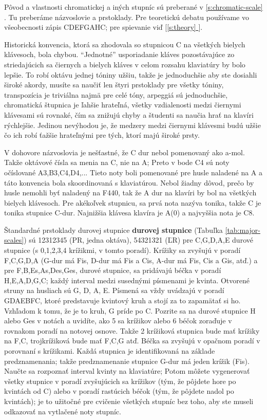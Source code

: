 \documentclass[11pt,a4paper]{book}
\newcommand*{\fullref}[1]{\hyperref[{#1}]{\ref*{#1} \nameref*{#1}}} %
\newcommand*{\fullrefp}[1]{[\fullref{#1}]} %
\begin{document}
Pôvod a vlastnosti chromatickej a iných stupníc sú preberané v \fullref{s:chromatic-scale}. Tu preberáme názvoslovie a prstoklady. Pre teoretickú debatu používame vo všeobecnosti zápis CDEFGAHC; pre spievanie viď \fullrefp{s:theory}.

Historická konvencia, ktorá sa zhodovala so stupnicou C na všetkých bielych klávesoch, bola chybou. “Jednotné” usporiadanie kláves pozostávajúce zo striedajúcich sa čiernych a bielych kláves v celom rozsahu klaviatúry by bolo lepšie. To robí oktávu jednej tóniny užšiu, takže je jednoduchšie aby ste dosiahli široké akordy, musíte sa naučiť len štyri prstoklady pre všetky tóniny, transpozícia je triviálna najmä pre celé tóny, arpeggiá sú jednoduchšie, chromatická štupnica je ľahšie hrateľná, všetky vzdialenosti medzi čiernymi klávesami sú rovnaké, čím sa znižujú chyby a študenti sa naučia hrať na klavíri rýchlejšie. Jedinou nevýhodou je, že medzery medzi čiernymi klávesmi budú užšie čo ich  robí ťažšie hrateľnými pre tých, ktorí majú široké prsty.

V dohovore názvoslovia je nešťastné, že C dur nebol pomenovaný ako a-mol. Takže oktávové čísla sa menia na C, nie na A; Preto v bode C4 sú noty očíslované A3,B3,C4,D4,... Tieto noty boli pomenované pre husle naladené na A a táto konvencia bola skoordinovaná s klaviatúrou. Nebol žiadny dôvod, prečo by husle nemohli byť naladený na F440, tak že A dur na klavíri by bol na všetkých bielych klávesoch. Pre akékoľvek stupnicu, sa prvá nota nazýva tonika, takže C je tonika stupnice C-dur. Najnižšia klávesa klavíra je A(0) a najvyššia nota je C8.

Štandardné prstoklady durovej stupnice \textbf{durovej stupnice} (Tabuľka \ref{tab:major-scales}) sú 12312345 (PR, jedna oktáva), 54321321 (ĽR) pre C,G,D,A,E durové stupnice (s 0,1,2,3,4 krížikmi, v tomto poradí). Krížiky sa zvyšujú v poradí F,C,G,D,A (G-dur má Fis, D-dur má Fis a Cis, A-dur má Fis, Cis a Gis, atď.) a pre F,B,Es,As,Des,Ges, durové stupnice, sa pridávajú béčka v poradí H,E,A,D,G,C; každý interval medzi susednými písmenami je kvinta. Otvorené struny na husliach sú G, D, A, E. Písmená sa vždy uvádzajú v poradí GDAEBFC, ktoré predstavuje kvintový kruh a stojí za to zapamätať si ho. Vzhľadom k tomu, že je to kruh, G príde po C. Pozrite sa na durové stupnice H alebo Ges v notách a uvidíte, ako 5 sa krížikov alebo 6 béčok zoraďuje v rovnakom poradí na notovej osnove. Takže 2 krížiková stupnica bude mať krížiky na F,C, trojkrížiková bude mať F,C,G atď. Béčka sa zvyšujú v opačnom poradí v porovnaní s krížikami. Každá stupnica je identifikovaná na základe  predznamenania; takže predznamenanie stupnice G-dur má jeden krížik (Fis). Naučte sa rozpoznať interval kvinty na klaviatúre; Potom môžete vygenerovať všetky stupnice v poradí zvyšujúcich sa krížikov (tým, že pôjdete hore po kvintách od C) alebo v poradí rastúcich béčok (tým, že pôjdete nadol po kvintách); je to užitočné pre cvičenie všetkých stupníc bez toho, aby ste museli odkazovať na vytlačené noty stupníc.
\end{document}
